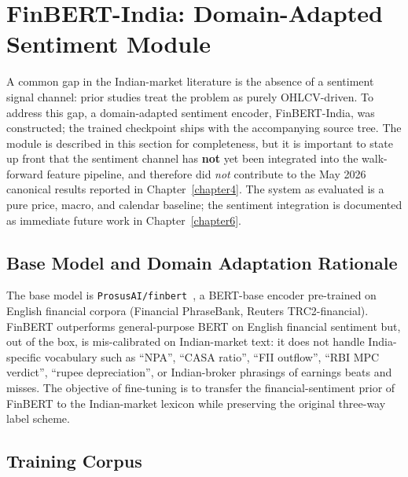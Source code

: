 \section{FinBERT-India: Domain-Adapted Sentiment Module}
\label{sec:finbert_india}

A common gap in the Indian-market literature is the absence of a sentiment signal channel: prior studies treat the problem as purely OHLCV-driven. To address this gap, a domain-adapted sentiment encoder, FinBERT-India, was constructed; the trained checkpoint ships with the accompanying source tree. The module is described in this section for completeness, but it is important to state up front that the sentiment channel has \textbf{not} yet been integrated into the walk-forward feature pipeline, and therefore did \emph{not} contribute to the May 2026 canonical results reported in Chapter~\ref{chapter4}. The system as evaluated is a pure price, macro, and calendar baseline; the sentiment integration is documented as immediate future work in Chapter~\ref{chapter6}.

\subsection{Base Model and Domain Adaptation Rationale}

The base model is \texttt{ProsusAI/finbert}~\cite{araci2019finbert}, a BERT-base encoder pre-trained on English financial corpora (Financial PhraseBank, Reuters TRC2-financial). FinBERT outperforms general-purpose BERT on English financial sentiment but, out of the box, is mis-calibrated on Indian-market text: it does not handle India-specific vocabulary such as \enquote{NPA}, \enquote{CASA ratio}, \enquote{FII outflow}, \enquote{RBI MPC verdict}, \enquote{rupee depreciation}, or Indian-broker phrasings of earnings beats and misses. The objective of fine-tuning is to transfer the financial-sentiment prior of FinBERT to the Indian-market lexicon while preserving the original three-way label scheme.

\subsection{Training Corpus}

